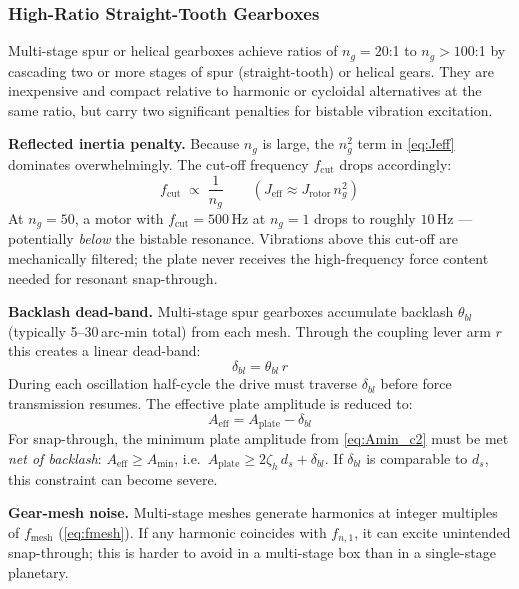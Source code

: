 \documentclass[11pt,letterpaper]{article}
\begin{document}
\subsubsection{High-Ratio Straight-Tooth Gearboxes}
\label{sssec:highratiospur}

Multi-stage spur or helical gearboxes achieve ratios of $n_g = 20$:1 to
$n_g > 100$:1 by cascading two or more stages of spur (straight-tooth) or
helical gears.  They are inexpensive and compact relative to harmonic or
cycloidal alternatives at the same ratio, but carry two significant penalties
for bistable vibration excitation.

\textbf{Reflected inertia penalty.}  Because $n_g$ is large, the $n_g^2$ term
in \cref{eq:Jeff} dominates overwhelmingly.  The cut-off frequency $f_{\mathrm{cut}}$
drops accordingly:
\begin{equation}
  f_{\mathrm{cut}} \;\propto\; \frac{1}{n_g}
  \qquad (J_{\mathrm{eff}} \approx J_{\mathrm{rotor}}\,n_g^2)
  \label{eq:fcut_highrat}
\end{equation}
At $n_g = 50$, a motor with $f_{\mathrm{cut}} = 500$\,Hz at $n_g = 1$ drops to
roughly $10$\,Hz --- potentially \emph{below} the bistable resonance.  Vibrations
above this cut-off are mechanically filtered; the plate never receives the
high-frequency force content needed for resonant snap-through.

\textbf{Backlash dead-band.}  Multi-stage spur gearboxes accumulate backlash
$\theta_{bl}$ (typically 5--30\,arc-min total) from each mesh.  Through the
coupling lever arm $r$ this creates a linear dead-band:
\begin{equation}
  \delta_{bl} = \theta_{bl}\,r
  \label{eq:deadband}
\end{equation}
During each oscillation half-cycle the drive must traverse $\delta_{bl}$ before
force transmission resumes.  The effective plate amplitude is reduced to:
\begin{equation}
  A_{\mathrm{eff}} = A_{\mathrm{plate}} - \delta_{bl}
  \label{eq:Aeff_bl}
\end{equation}
For snap-through, the minimum plate amplitude from \cref{eq:Amin_c2} must be met
\emph{net of backlash}: $A_{\mathrm{eff}} \geq A_{\min}$, i.e.\
$A_{\mathrm{plate}} \geq 2\zeta_h\,d_s + \delta_{bl}$.  If $\delta_{bl}$ is
comparable to $d_s$, this constraint can become severe.

\textbf{Gear-mesh noise.}  Multi-stage meshes generate harmonics at integer
multiples of $f_{\mathrm{mesh}}$ (\cref{eq:fmesh}).  If any harmonic coincides
with $f_{n,1}$, it can excite unintended snap-through; this is harder to avoid
in a multi-stage box than in a single-stage planetary.
\end{document}
